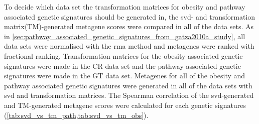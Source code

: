 To decide which data set the transformation matrices for obesity and pathway associated genetic signatures should be generated in, the \gls{svd}- and transformation matrix(TM)-generated metagene scores were compared in all of the data sets.
As in \cref{sec:pathway_associated_genetic_signatures_from_gatza2010a_study}, all data sets were normalised with the \gls{rma} method and metagenes were ranked with fractional ranking.
Transformation matrices for the obesity associated genetic signatures were made in the CR data set and the pathway associated genetic signatures were made in the GT data set.
Metagenes for all of the obesity and pathway associated genetic signatures were generated in all of the data sets with \gls{svd} and transformation matrices.
The Spearman correlation of the \gls{svd}-generated and TM-generated metagene scores were calculated for each genetic signatures (\cref{tab:svd_vs_tm_path,tab:svd_vs_tm_obs}).


